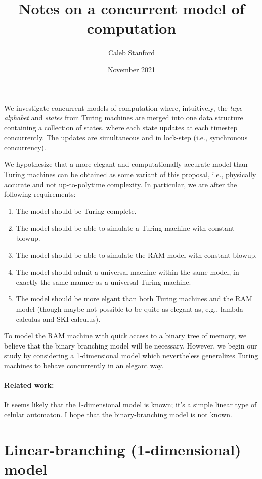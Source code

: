 \documentclass{article}
\title{Notes on a concurrent model of computation}
\author{Caleb Stanford}
\date{November 2021}
\theoremstyle{definition}
\begin{document}
\maketitle

We investigate concurrent models of computation where, intuitively,
the \emph{tape alphabet} and \emph{states} from Turing machines
are merged into one data structure containing a collection of states,
where each state updates at each timestep concurrently.
The updates are simultaneous and in lock-step (i.e., synchronous concurrency).

We hypothesize that a more elegant and computationally accurate model than
Turing machines can be obtained as some variant of this proposal, i.e., physically accurate and not up-to-polytime complexity.
In particular, we are after the following requirements:
\begin{enumerate}
\item The model should be Turing complete.
\item The model should be able to simulate a Turing machine with constant blowup.
\item The model should be able to simulate the RAM model with constant blowup.
\item The model should admit a universal machine within the same model, in exactly the same manner as a universal Turing machine.
\item The model should be more elgant than both Turing machines and the RAM model (though maybe not possible to be quite as elegant as, e.g., lambda calculus and SKI calculus).
\end{enumerate}

To model the RAM machine with quick access to a binary tree of memory, we believe that the binary branching model will be necessary. However, we begin
our study by considering a 1-dimensional model which nevertheless generalizes Turing machines to behave concurrently in an elegant way.

\paragraph{Related work:} It seems likely that the 1-dimensional model is known; it's a simple linear type of celular automaton. I hope that the binary-branching model is not known.

\section{Linear-branching (1-dimensional) model}
\end{document}
